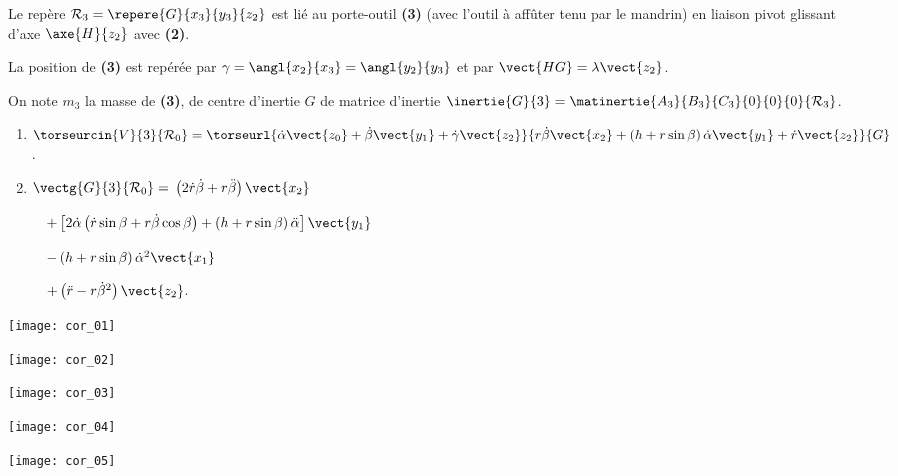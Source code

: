 Le repère $\mathcal{R}_3=\repere{G}{x_3}{y_3}{z_2}$ est lié au porte-outil  \textbf{(3)} (avec l'outil à affûter tenu par le mandrin) en liaison pivot glissant d'axe $\axe{H}{z_2}$ avec \textbf{(2)}. 

La position de \textbf{(3)} est repérée par $\gamma=\angl{x_2}{x_3}=\angl{y_2}{y_3}$ et par $\vect{HG}=\lambda\vect{z_2}$. 

On note $m_3$ la masse de \textbf{(3)}, de centre d'inertie $G$ de matrice d'inertie $\inertie{G}{3}=\matinertie{A_3}{B_3}{C_3}{0}{0}{0}{\mathcal{R}_3}$.








\ifprof
\begin{enumerate}
\item $\torseurcin{V}{3}{\mathcal{R}_0}=\torseurl{\dot{\alpha}\vect{z_0}+\dot{\beta}\vect{y_1}+\dot{\gamma}\vect{z_2}}{r\dot{\beta}\vect{x_2}+\left( h+r\sin \beta \right)\dot{\alpha}\vect{y_1}+\dot{r}\vect{z_2}}{G}$.
\item $\vectg{G}{3}{\mathcal{R}_0}=$
$\left(2\dot{r}\dot{\beta}+r\ddot{\beta} \right)\vect{x_2}$

$\quad +\left[2\dot{\alpha}\left( \dot{r}\sin\beta +r\dot{\beta} \cos \beta \right) + \left(h+r\sin\beta \right)\ddot{ \alpha}\right]\vect{y_1}$

$\quad -\left(h+r\sin\beta \right)\dot{\alpha}^2\vect{x_1}$

$\quad +\left(\ddot{r}-r\dot{\beta}^2 \right)\vect{z_2}$.
\end{enumerate}
\else
\fi


\ifprof
\begin{center}
\texttt{[image: cor\_01]}
\end{center}
\begin{center}
\texttt{[image: cor\_02]}
\end{center}
\begin{center}
\texttt{[image: cor\_03]}
\end{center}
\begin{center}
\texttt{[image: cor\_04]}
\end{center}
\begin{center}
\texttt{[image: cor\_05]}
\end{center}
\else
\fi


